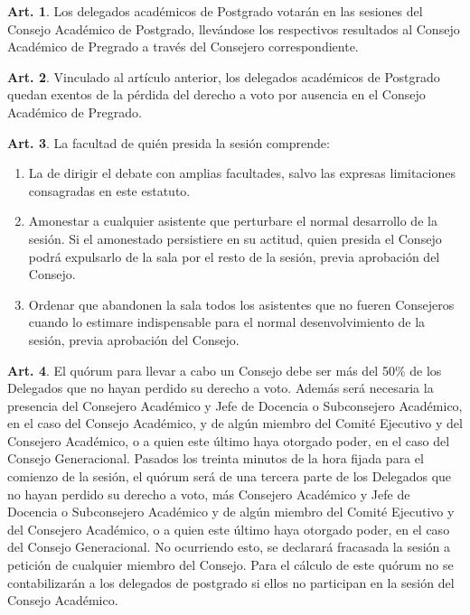 \documentclass[letterpaper,11pt]{article}
\theoremstyle{definition}%
\newtheorem{art}{Art.} %
\begin{document}
\begin{art}\label{sesionesPostgrado}
	Los delegados académicos de Postgrado votarán en las sesiones del Consejo Académico de Postgrado, llevándose los respectivos resultados al Consejo Académico de Pregrado a través del Consejero correspondiente.
\end{art}

\begin{art}\label{votosPostgrado}
	Vinculado al artículo anterior, los delegados académicos de Postgrado quedan exentos de la pérdida del derecho a voto por ausencia en el Consejo Académico de Pregrado.
\end{art}

\begin{art}\label{facultadesPrecide}
	La facultad de quién presida la sesión comprende:
	\begin{enumerate}
		\item La de dirigir el debate con amplias facultades, salvo las expresas limitaciones consagradas en este estatuto.
		\item Amonestar a cualquier asistente que perturbare el normal desarrollo de la sesión. Si el amonestado persistiere en su actitud,  quien presida el Consejo podrá expulsarlo de la sala por el resto de la sesión, previa aprobación del Consejo.
		\item Ordenar que abandonen la sala todos los asistentes que no fueren Consejeros cuando lo estimare indispensable para el normal desenvolvimiento de la sesión, previa aprobación del Consejo.
	\end{enumerate}
\end{art}

\begin{art}\label{quorumConsejo}
	El quórum para llevar a cabo un Consejo debe ser más del 50\% de los Delegados que no hayan perdido su derecho a voto. Además será necesaria la presencia del Consejero Académico y Jefe de Docencia o Subconsejero Académico, en el caso del Consejo Académico, y de algún miembro del Comité Ejecutivo y del Consejero Académico, o a quien este último haya otorgado poder, en el caso del Consejo Generacional. Pasados los treinta minutos de la hora fijada para el comienzo de la sesión, el quórum será de una tercera parte de los Delegados que no hayan perdido su derecho a voto, más Consejero Académico y Jefe de Docencia o Subconsejero Académico y de algún miembro del Comité Ejecutivo y del Consejero Académico, o a quien este último haya otorgado poder, en el caso del Consejo Generacional. No ocurriendo esto, se declarará fracasada la sesión a petición de cualquier miembro del Consejo. Para el cálculo de este quórum no se contabilizarán a los delegados de postgrado si ellos no participan en la sesión del Consejo Académico.
\end{art}
\end{document}
